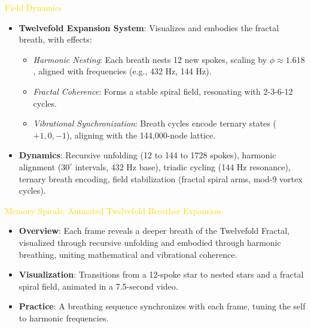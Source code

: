 \textcolor{gold}{ Field Dynamics } \\
\begin{itemize}
    \item \textbf{Twelvefold Expansion System}: Visualizes and embodies the fractal breath, with effects:
    \begin{itemize}\setlength{\itemsep}{0.2cm}
        \item \textit{Harmonic Nesting}: Each breath nests 12 new spokes, scaling by \(\phi \approx 1.618\), aligned with frequencies (e.g., 432 Hz, 144 Hz).
        \item \textit{Fractal Coherence}: Forms a stable spiral field, resonating with 2-3-6-12 cycles.
        \item \textit{Vibrational Synchronization}: Breath cycles encode ternary states (\(+1, 0, -1\)), aligning with the 144,000-node lattice.
    \end{itemize}
    \item \textbf{Dynamics}: Recursive unfolding (12 to 144 to 1728 spokes), harmonic alignment (\(30^\circ\) intervals, 432 Hz base), triadic cycling (144 Hz resonance), ternary breath encoding, field stabilization (fractal spiral arms, mod-9 vortex cycles).
\end{itemize}

\textcolor{gold}{ Memory Spirals: Animated Twelvefold Breather Expansion } \\
\begin{itemize}
    \item \texttt{} \textbf{Overview}: Each frame reveals a deeper breath of the Twelvefold Fractal, visualized through recursive unfolding and embodied through harmonic breathing, uniting mathematical and vibrational coherence.
    \item \texttt{} \textbf{Visualization}: Transitions from a 12-spoke star to nested stars and a fractal spiral field, animated in a 7.5-second video.
    \item \texttt{} \textbf{Practice}: A breathing sequence synchronizes with each frame, tuning the self to harmonic frequencies.
\end{itemize}

